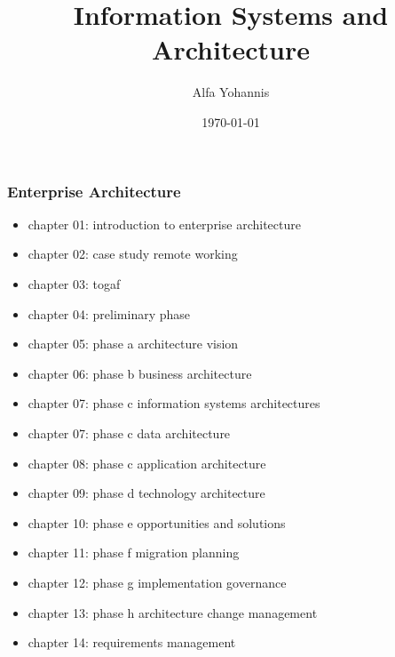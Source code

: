 \documentclass[]{beamer}
\title{Information Systems and Architecture}
\author{Alfa Yohannis}
\date{\today}
\begin{document}
	
\frame{\titlepage}
	
\begin{frame}
    \frametitle{Enterprise Architecture}
    \begin{itemize}
        \item chapter 01: introduction to enterprise architecture
        \item chapter 02: case study remote working
        \item chapter 03: togaf
        \item chapter 04: preliminary phase
        \item chapter 05: phase a architecture vision
        \item chapter 06: phase b business architecture
        \item chapter 07: phase c information systems architectures
        \item chapter 07: phase c data architecture
        \item chapter 08: phase c application architecture
        \item chapter 09: phase d technology architecture
        \item chapter 10: phase e opportunities and solutions
        \item chapter 11: phase f migration planning
        \item chapter 12: phase g implementation governance
        \item chapter 13: phase h architecture change management
        \item chapter 14: requirements management
    \end{itemize}
\end{frame}
\end{document}
